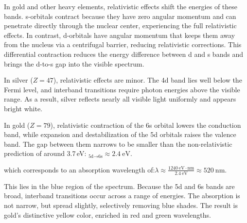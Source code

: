 In gold and other heavy elements, relativistic effects shift the energies of these bands. s-orbitals contract because they have zero angular momentum and can penetrate directly through the nuclear center, experiencing the full relativistic effects. In contrast, d-orbitals have angular momentum that keeps them away from the nucleus via a centrifugal barrier, reducing relativistic corrections. This differential contraction reduces the energy difference between d and s bands and brings the d-to-s gap into the visible spectrum.

In silver ($Z = 47$), relativistic effects are minor. The 4d band lies well below the Fermi level, and interband transitions require photon energies above the visible range. As a result, silver reflects nearly all visible light uniformly and appears bright white.

In gold ($Z = 79$), relativistic contraction of the 6s orbital lowers the conduction band, while expansion and destabilization of the 5d orbitals raises the valence band. The gap between them narrows to be smaller than the non-relativistic prediction of around 3.7 eV: $_{\text{5d} \to \text{6s}} \approx 2.4\ \text{eV}.$

which corresponds to an absorption wavelength of:$\lambda \approx \frac{1240\ \text{eV}\cdot\text{nm}}{2.4\ \text{eV}} \approx 520\ \text{nm}.$

This lies in the blue region of the spectrum. Because the 5d and 6s bands are broad, interband transitions occur across a range of energies. The absorption is not narrow, but spread slightly, selectively removing blue shades. The result is gold’s distinctive yellow color, enriched in red and green wavelengths.




